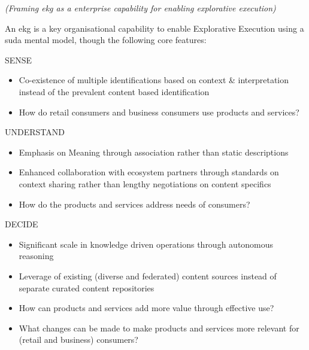 \textit{(Framing \gls{ekg} as a enterprise capability for enabling explorative execution)}

An \gls{ekg} is a key organisational capability to enable Explorative Execution using a \gls{suda} mental model,
though the following core features:

\begin{basedescript}{%
    \desclabelstyle{\multilinelabel}
    \desclabelwidth{2.6cm}
}
    \item[SENSE]
        \begin{itemize}
            \item Co-existence of multiple identifications based on context \& interpretation instead of
                  the prevalent content based identification
            \item How do retail consumers and business consumers use products and services?
        \end{itemize}
    \item[UNDERSTAND]
        \begin{itemize}
            \item Emphasis on Meaning through association rather than static descriptions
            \item Enhanced collaboration with ecosystem partners through standards on context sharing
                  rather than lengthy negotiations on content specifics
            \item How do the products and services address needs of consumers?
        \end{itemize}
    \item[DECIDE]
        \begin{itemize}
            \item Significant scale in knowledge driven operations through autonomous reasoning
            \item Leverage of existing (diverse and federated) content sources instead of
                  separate curated content repositories
            \item How can products and services add more value through effective use?
            \item What changes can be made to make products and services more relevant
                  for (retail and business) consumers?
        \end{itemize}
\end{basedescript}

